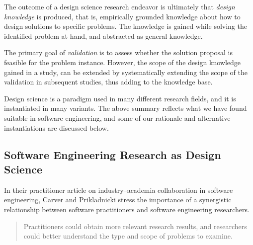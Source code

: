\documentclass[graybox]{svmult}
\begin{document}
The outcome of a design science research endeavor is ultimately that \emph{design knowledge} is produced, that is, empirically grounded knowledge about how to design solutions to specific problems. The knowledge is gained while solving the identified problem at hand, and abstracted as general knowledge. 

 The primary goal of \emph{validation} is to assess whether the solution proposal is feasible for the problem instance. However, the scope of the design knowledge gained in a study, can be extended by systematically extending the scope of the validation in subsequent studies, thus adding to the knowledge base. 



Design science is a paradigm used in many different research fields, and it is instantiated in many variants.  The above summary reflects what we have found suitable in software engineering, and some of our rationale and alternative instantiations are discussed below.




\subsection{Software Engineering Research as Design Science}

In their practitioner article on industry--academia collaboration in software engineering, Carver and Prikladnicki stress the importance of a synergistic relationship between software practitioners and software engineering researchers.
\begin{quote}Practitioners could obtain more relevant research results, and researchers could better understand the type and scope of problems to examine.~\cite{CarverIEEESW2018}
\end{quote} 
\end{document}
